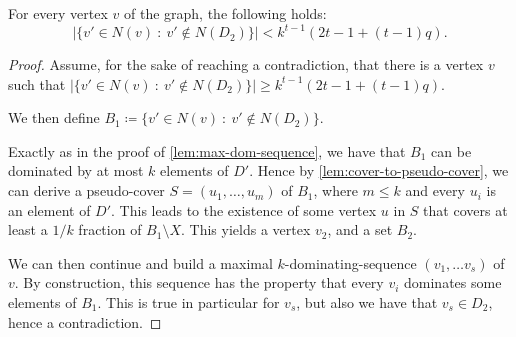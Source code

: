 \begin{lemma}\label{lem:smalldegree}
  For every vertex $v$ of the graph, the following holds:
  \[|\{v'\in N(v) ~:~ v' \not\in N(D_2)\}| < k^{t-1}(2t-1+(t-1)q).\]

\end{lemma}
\begin{proof}
  Assume, for the sake of reaching a contradiction, that there is a vertex $v$
  such that $|\{v'\in N(v) ~:~ v' \not\in N(D_2)\}| \ge  k^{t-1}(2t-1+(t-1)q)$.

  We then define $B_1\coloneqq \{v'\in N(v) ~:~ v' \not\in N(D_2)\}$.

  Exactly as in the proof of \cref{lem:max-dom-sequence}, we have that $B_1$
  can be dominated by at most $k$ elements of $D'$. Hence by
  \cref{lem:cover-to-pseudo-cover}, we can derive a
  pseudo-cover $S=(u_1,\ldots,u_m)$ of
  $B_1$, where $m\le k$ and every $u_i$ is an element of $D'$. This
  leads to the existence of some vertex $u$ in $S$ that covers at least a
  $1/k$ fraction of $B_1\setminus X$. This yields a vertex $v_2$, and a set $B_2$.

  We can then continue and build a maximal $k$-dominating-sequence
  $(v_1,\ldots v_s)$ of $v$. By construction, this sequence has the property
  that every $v_i$ dominates some elements of $B_1$. This is true in particular
  for $v_s$, but also we have that $v_s\in D_2$, hence a contradiction.

\end{proof}


